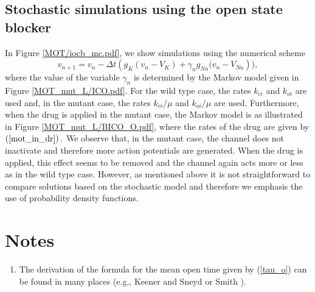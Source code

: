 \subsection{Stochastic simulations using the open state blocker}

In Figure \ref{MOT/iocb_mc.pdf}, we show simulations using the numerical scheme%
\begin{equation}
v_{n+1}=v_{n}-\Delta t\left(  g_{K}\left(  v_{n}-V_{K}\right)  +\gamma
_{n}g_{Na}(v_{n}-V_{Na}\right)  ), \label{s1000}%
\end{equation}
where the value of the variable $\gamma_{n}$ 
is determined by the Markov model given in
Figure \ref{MOT_mut_L/ICO.pdf}. For the wild type case, the rates $k_{ci}$ and $k_{oi}$
are used and, in the mutant case, the rates $k_{ci}/\mu$ and $k_{oi}%
/\mu$ are used. Furthermore, when the drug is applied in the mutant case, the Markov
model is as illustrated in Figure \ref{MOT_mut_L/BICO_O.pdf}, where the rates of
the drug are given by $\left(\ref{mot_in_dr}\right).$ We observe that, in the
mutant case, the channel does not inactivate and therefore more action
potentials are generated. When the drug is applied, this effect seems to be removed and
the channel again acts more or less as in the wild type case. However, as mentioned above
it is not straightforward to compare solutions based on the stochastic model and therefore we emphasis
the use of probability density functions. 


\section{Notes}

\begin{enumerate}
\item The derivation of the formula for the mean open time given by (\ref{tau_o}) can be found in many
places (e.g., Keener and Sneyd \cite{KeenerSneyd} or Smith \cite{Smith2002}). 
\end{enumerate}


